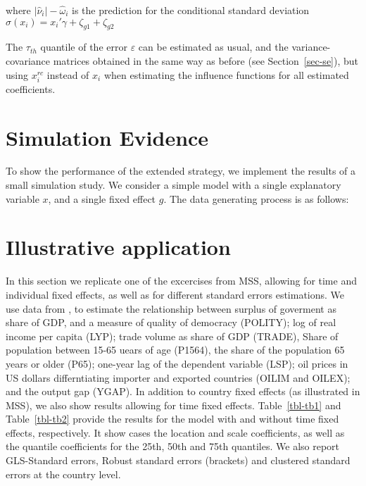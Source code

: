 \documentclass[
  authoryear,
  preprint,
  1p]{elsarticle}
\begin{document}
where \(|\hat\nu_{i}|- \hat \omega_{i}\) is the prediction for the
conditional standard deviation
\(\sigma(x_i)=x_{i}' \gamma + \zeta_{g1} + \zeta_{g2}\)

The \(\tau_{th}\) quantile of the error \(\varepsilon\) can be estimated
as usual, and the variance-covariance matrices obtained in the same way
as before (see Section~\ref{sec-se}), but using \(x_{i}^{rc}\) instead
of \(x_{i}\) when estimating the influence functions for all estimated
coefficients.

\hypertarget{simulation-evidence}{%
\section{Simulation Evidence}\label{simulation-evidence}}

To show the performance of the extended strategy, we implement the
results of a small simulation study. We consider a simple model with a
single explanatory variable \(x\), and a single fixed effect \(g\). The
data generating process is as follows:

\hypertarget{illustrative-application}{%
\section{Illustrative application}\label{illustrative-application}}

In this section we replicate one of the excercises from MSS, allowing
for time and individual fixed effects, as well as for different standard
errors estimations. We use data from \citet{persson_economic_2005}, to
estimate the relationship between surplus of goverment as share of GDP,
and a measure of quality of democracy (POLITY); log of real income per
capita (LYP); trade volume as share of GDP (TRADE), Share of population
between 15-65 uears of age (P1564), the share of the population 65 years
or older (P65); one-year lag of the dependent variable (LSP); oil prices
in US dollars differntiating importer and exported countries (OILIM and
OILEX); and the output gap (YGAP). In addition to country fixed effects
(as illustrated in MSS), we also show results allowing for time fixed
effects. Table~\ref{tbl-tb1} and Table~\ref{tbl-tb2} provide the results
for the model with and without time fixed effects, respectively. It show
cases the location and scale coefficients, as well as the quantile
coefficients for the 25th, 50th and 75th quantiles. We also report
GLS-Standard errors, Robust standard errors (brackets) and clustered
standard errors at the country level.
\end{document}
